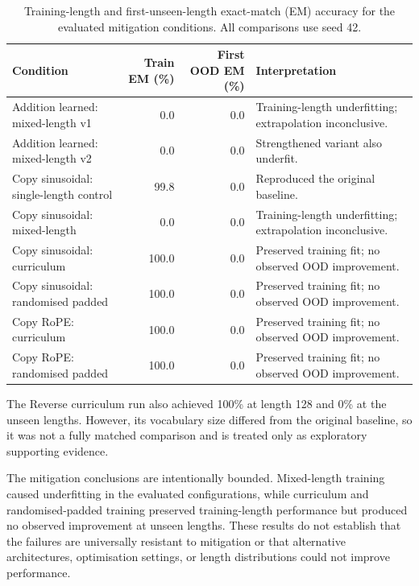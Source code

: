 \documentclass[
    author={Aanchala Ravindra Bhongade},
    supervisor={Dr. Fernando Moreno-Pino},
    degree={MSc},
    title={Length Generalisation in Transformer-Based Sequence Models: Failure Taxonomy and Mitigation Strategies},
    subtitle={},
    type={},
    year={2026}
]{dissertation}
\begin{document}
\begin{table}[htbp]
\centering
\scriptsize
\setlength{\tabcolsep}{4pt}
\begin{tabular}{p{4.2cm}rrp{5.0cm}}
\hline
Condition &
Train EM (\%) &
First OOD EM (\%) &
Interpretation \\
\hline
Addition learned: mixed-length v1
& 0.0 & 0.0
& Training-length underfitting; extrapolation inconclusive. \\

Addition learned: mixed-length v2
& 0.0 & 0.0
& Strengthened variant also underfit. \\

Copy sinusoidal: single-length control
& 99.8 & 0.0
& Reproduced the original baseline. \\

Copy sinusoidal: mixed-length
& 0.0 & 0.0
& Training-length underfitting; extrapolation inconclusive. \\

Copy sinusoidal: curriculum
& 100.0 & 0.0
& Preserved training fit; no observed OOD improvement. \\

Copy sinusoidal: randomised padded
& 100.0 & 0.0
& Preserved training fit; no observed OOD improvement. \\

Copy RoPE: curriculum
& 100.0 & 0.0
& Preserved training fit; no observed OOD improvement. \\

Copy RoPE: randomised padded
& 100.0 & 0.0
& Preserved training fit; no observed OOD improvement. \\
\hline
\end{tabular}
\caption{Training-length and first-unseen-length exact-match (EM) accuracy for the evaluated mitigation conditions. All comparisons use seed 42.}
\label{tab:mitigation-outcomes}
\end{table}

The Reverse curriculum run also achieved 100\% at length 128 and 0\% at the unseen lengths. However, its vocabulary size differed from the original baseline, so it was not a fully matched comparison and is treated only as exploratory supporting evidence.

The mitigation conclusions are intentionally bounded. Mixed-length training caused underfitting in the evaluated configurations, while curriculum and randomised-padded training preserved training-length performance but produced no observed improvement at unseen lengths. These results do not establish that the failures are universally resistant to mitigation or that alternative architectures, optimisation settings, or length distributions could not improve performance.
\end{document}
